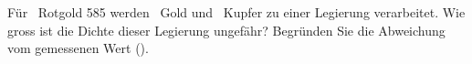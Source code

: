 Für \mRoO\ Rotgold 585 werden \mAuO\ Gold und \mCuO\ Kupfer zu einer Legierung verarbeitet. Wie gross ist die Dichte dieser Legierung ungefähr? Begründen Sie die Abweichung vom gemessenen Wert (\rMeO).
